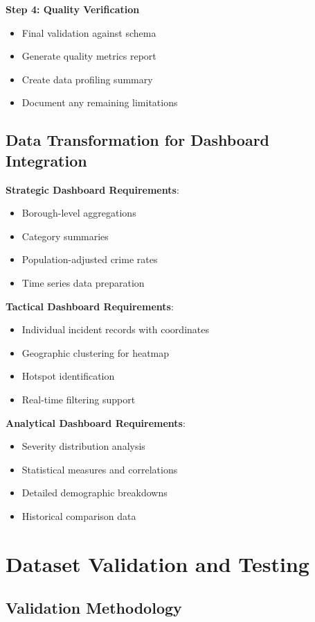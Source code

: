 \documentclass[12pt,a4paper]{article}
\begin{document}
\textbf{Step 4: Quality Verification}
\begin{itemize}
    \item Final validation against schema
    \item Generate quality metrics report
    \item Create data profiling summary
    \item Document any remaining limitations
\end{itemize}

\subsection{Data Transformation for Dashboard Integration}

\textbf{Strategic Dashboard Requirements}:
\begin{itemize}
    \item Borough-level aggregations
    \item Category summaries
    \item Population-adjusted crime rates
    \item Time series data preparation
\end{itemize}

\textbf{Tactical Dashboard Requirements}:
\begin{itemize}
    \item Individual incident records with coordinates
    \item Geographic clustering for heatmap
    \item Hotspot identification
    \item Real-time filtering support
\end{itemize}

\textbf{Analytical Dashboard Requirements}:
\begin{itemize}
    \item Severity distribution analysis
    \item Statistical measures and correlations
    \item Detailed demographic breakdowns
    \item Historical comparison data
\end{itemize}

\section{Dataset Validation and Testing}

\subsection{Validation Methodology}
\end{document}
